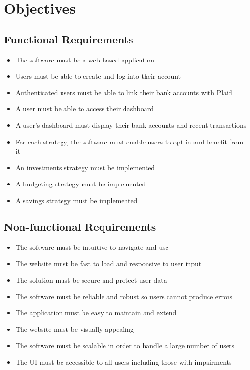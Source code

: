 \section{Objectives}

\subsection{Functional Requirements}
\begin{itemize}
	\item The software must be a web-based application
	\item Users must be able to create and log into their account
	\item Authenticated users must be able to link their bank accounts with Plaid
	\item A user must be able to access their dashboard
	\item A user's dashboard must display their bank accounts and recent transactions
	\item For each strategy, the software must enable users to opt-in and benefit from it 
	\item An investments strategy must be implemented \cite{InvestBook}
	\item A budgeting strategy must be implemented \cite{BudgettingBook}
	\item A savings strategy must be implemented \cite{MoneyBook}
\end{itemize}

\subsection{Non-functional Requirements}
\begin{itemize}
	\item The software must be intuitive to navigate and use
	\item The website must be fast to load and responsive to user input
	\item The solution must be secure and protect user data
	\item The software must be reliable and robust so users cannot produce errors
	\item The application must be easy to maintain and extend
	\item The website must be visually appealing
	\item The software must be scalable in order to handle a large number of users
	\item The UI must be accessible to all users including those with impairments
\end{itemize}

